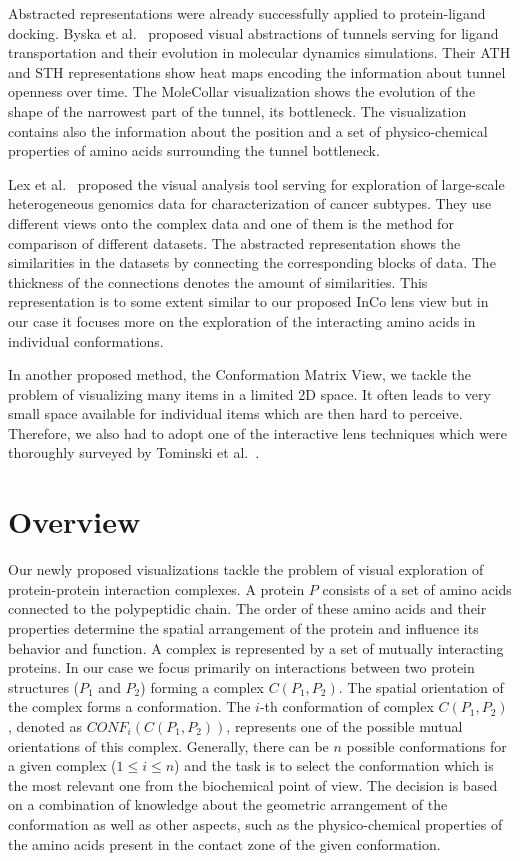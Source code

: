 \documentclass[journal]{vgtc}                %
\begin{document}
Abstracted representations were already successfully applied to protein-ligand docking.
Byska et al.~\cite{Byska2015} proposed visual abstractions of tunnels serving for ligand transportation and their evolution in molecular dynamics simulations.
Their ATH and STH representations show heat maps encoding the information about tunnel openness over time.
The MoleCollar visualization shows the evolution of the shape of the narrowest part of the tunnel, its bottleneck.
The visualization contains also the information about the position and a set of physico-chemical properties of amino acids surrounding the tunnel bottleneck.

Lex et al.~\cite{Lex2012} proposed the visual analysis tool serving for exploration of large-scale heterogeneous genomics data for characterization of cancer subtypes.
They use different views onto the complex data and one of them is the method for comparison of different datasets.
The abstracted representation shows the similarities in the datasets by connecting the corresponding blocks of data. 
The thickness of the connections denotes the amount of similarities.
This representation is to some extent similar to our proposed InCo lens view but in our case it focuses more on the exploration of the interacting amino acids in individual conformations.

In another proposed method, the Conformation Matrix View, we tackle the problem of visualizing many items in a limited 2D space.
It often leads to very small space available for individual items which are then hard to perceive.
Therefore, we also had to adopt one of the interactive lens techniques which were thoroughly surveyed by Tominski et al.~\cite{Tominski2014}.


\section{Overview}
Our newly proposed visualizations tackle the problem of visual exploration of protein-protein interaction complexes.
A protein $P$ consists of a set of amino acids connected to the polypeptidic chain.
The order of these amino acids and their properties determine the spatial arrangement of the protein and influence its behavior and function.
A complex is represented by a set of mutually interacting proteins.
In our case we focus primarily on interactions between two protein structures ($P_1$ and $P_2$) forming a complex $C(P_1,P_2)$.
The spatial orientation of the complex forms a conformation.
The $i$-th conformation of complex $C(P_1,P_2)$, denoted as $CONF_i(C(P_1,P_2))$, represents one of the possible mutual orientations of this complex.
Generally, there can be $n$ possible conformations for a given complex ($1 \leq i \leq n$) and the task is to select the conformation which is the most relevant one from the biochemical point of view.
The decision is based on a combination of knowledge about the geometric arrangement of the conformation as well as other aspects, such as the physico-chemical properties of the amino acids present in the contact zone of the given conformation.
\end{document}
